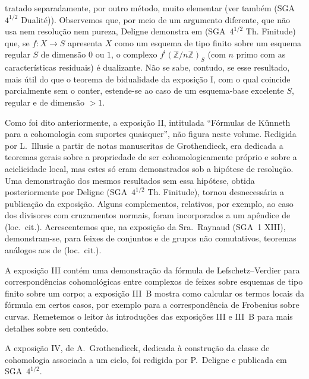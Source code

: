 \clearpage
\noindent tratado separadamente, por outro método, muito elementar (ver também (SGA~$4^{1/2}$ Dualité)). Observemos que, por meio de um argumento diferente, que não usa nem resolução nem pureza, Deligne demonstra em (SGA~$4^{1/2}$ Th. Finitude) que, se $f:X\longrightarrow S$ apresenta $X$ como um esquema de tipo finito sobre um esquema regular $S$ de dimensão $0$ ou $1$, o complexo $f^!(\mathbb Z/n\mathbb Z)_S$ (com $n$ primo com as características residuais) é dualizante. Não se sabe, contudo, se esse resultado, mais útil do que o teorema de bidualidade da exposição I, com o qual coincide parcialmente sem o conter, estende-se ao caso de um esquema-base excelente $S$, regular e de dimensão $>1$.

Como foi dito anteriormente, a exposição II, intitulada ``Fórmulas de Künneth para a cohomologia com suportes quaisquer'', não figura neste volume. Redigida por L.~Illusie a partir de notas manuscritas de Grothendieck, era dedicada a teoremas gerais sobre a propriedade de ser cohomologicamente próprio e sobre a aciclicidade local, mas estes só eram demonstrados sob a hipótese de resolução. Uma demonstração dos mesmos resultados sem essa hipótese, obtida posteriormente por Deligne (SGA~$4^{1/2}$ Th. Finitude), tornou desnecessária a publicação da exposição. Alguns complementos, relativos, por exemplo, ao caso dos divisores com cruzamentos normais, foram incorporados a um apêndice de (loc.~cit.). Acrescentemos que, na exposição da Sra.~Raynaud (SGA~1 XIII), demonstram-se, para feixes de conjuntos e de grupos não comutativos, teoremas análogos aos de (loc.~cit.).

A exposição III contém uma demonstração da fórmula de Lefschetz--Verdier para correspondências cohomológicas entre complexos de feixes sobre esquemas de tipo finito sobre um corpo; a exposição III~B mostra como calcular os termos locais da fórmula em certos casos, por exemplo para a correspondência de Frobenius sobre curvas. Remetemos o leitor às introduções das exposições III e III~B para mais detalhes sobre seu conteúdo.

A exposição IV, de A.~Grothendieck, dedicada à construção da classe de cohomologia associada a um ciclo, foi redigida por P.~Deligne e publicada em SGA~$4^{1/2}$.

